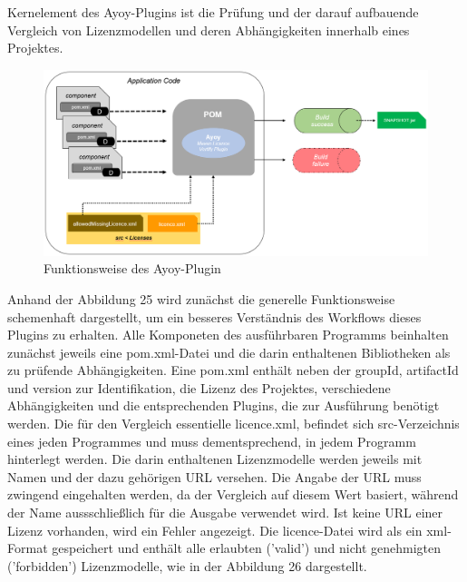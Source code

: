 Kernelement des Ayoy-Plugins ist die Prüfung und der darauf aufbauende Vergleich von Lizenzmodellen und deren Abhängigkeiten innerhalb eines Projektes.

\begin{figure}[h]
    \centering
    \includegraphics[scale=0.4]{Bilder/Ayoy-Plugin.png}
    \caption{Funktionsweise des Ayoy-Plugin}
\end{figure}

Anhand der Abbildung 25 wird zunächst die generelle Funktionsweise schemenhaft dargestellt, um ein besseres Verständnis des Workflows dieses Plugins zu erhalten. Alle Komponeten des ausführbaren Programms beinhalten zunächst jeweils eine pom.xml-Datei und die darin enthaltenen Bibliotheken als zu prüfende Abhängigkeiten. Eine pom.xml enthält neben der groupId, artifactId und version zur Identifikation, die Lizenz des Projektes, verschiedene Abhängigkeiten und die entsprechenden Plugins, die zur Ausführung benötigt werden. Die für den Vergleich essentielle licence.xml, befindet sich src-Verzeichnis eines jeden Programmes und muss dementsprechend, in jedem Programm hinterlegt werden. Die darin enthaltenen Lizenzmodelle werden jeweils mit Namen und der dazu gehörigen URL versehen. Die Angabe der URL muss zwingend eingehalten werden, da der Vergleich auf diesem Wert basiert, während der Name aussschließlich für die Ausgabe verwendet wird. Ist keine URL einer Lizenz vorhanden, wird ein Fehler angezeigt. Die licence-Datei wird als ein xml-Format gespeichert und enthält alle erlaubten ('valid') und nicht genehmigten ('forbidden') Lizenzmodelle, wie in der Abbildung 26 dargestellt. 

